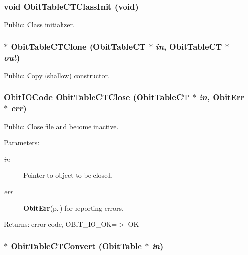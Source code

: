 \subsubsection{\setlength{\rightskip}{0pt plus 5cm}void Obit\-Table\-CTClass\-Init (void)}\label{ObitTableCT_8h_a10}


Public: Class initializer. 

\subsubsection{$\ast$ Obit\-Table\-CTClone ({\bf Obit\-Table\-CT} $\ast$ {\em in}, {\bf Obit\-Table\-CT} $\ast$ {\em out})}\label{ObitTableCT_8h_a15}


Public: Copy (shallow) constructor. 

\subsubsection{\setlength{\rightskip}{0pt plus 5cm}Obit\-IOCode Obit\-Table\-CTClose ({\bf Obit\-Table\-CT} $\ast$ {\em in}, {\bf Obit\-Err} $\ast$ {\em err})}\label{ObitTableCT_8h_a21}


Public: Close file and become inactive. 

\begin{Desc}
\item[Parameters:]
\begin{description}
\item[{\em in}]Pointer to object to be closed. \item[{\em err}]{\bf Obit\-Err}{\rm (p.\,\pageref{structObitErr})} for reporting errors. \end{description}
\end{Desc}
\begin{Desc}
\item[Returns:]error code, OBIT\_\-IO\_\-OK=$>$ OK \end{Desc}
\subsubsection{$\ast$ Obit\-Table\-CTConvert ({\bf Obit\-Table} $\ast$ {\em in})}\label{ObitTableCT_8h_a16}



